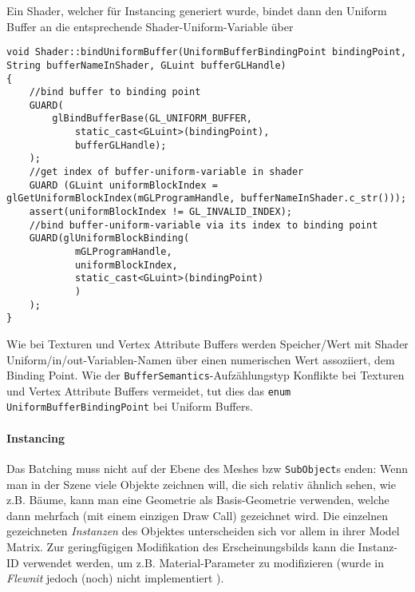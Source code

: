 	Ein Shader, welcher für Instancing generiert wurde, bindet dann den Uniform Buffer an die entsprechende 
	Shader-Uniform-Variable über
	\begin{lstlisting}
void Shader::bindUniformBuffer(UniformBufferBindingPoint bindingPoint, String bufferNameInShader, GLuint bufferGLHandle)
{
	//bind buffer to binding point
	GUARD(
		glBindBufferBase(GL_UNIFORM_BUFFER,
			static_cast<GLuint>(bindingPoint),
			bufferGLHandle);
	);
	//get index of buffer-uniform-variable in shader
	GUARD (GLuint uniformBlockIndex =  glGetUniformBlockIndex(mGLProgramHandle, bufferNameInShader.c_str()));
	assert(uniformBlockIndex != GL_INVALID_INDEX);
	//bind buffer-uniform-variable via its index to binding point	
	GUARD(glUniformBlockBinding(
			mGLProgramHandle,
			uniformBlockIndex,
			static_cast<GLuint>(bindingPoint)
			)
	);
}
	\end{lstlisting}
	Wie bei Texturen und Vertex Attribute Buffers werden Speicher/Wert mit Shader Uniform/in/out-Variablen-Namen 
	über einen numerischen Wert assoziiert, dem Binding Point. Wie der \lstinline|BufferSemantics|-Aufzählungstyp 
	Konflikte bei Texturen und Vertex Attribute Buffers vermeidet, tut dies das 
	\lstinline|enum UniformBufferBindingPoint| bei Uniform Buffers.


	
	\paragraph{Instancing}
	\label{sec:instancing}
	Das Batching muss nicht auf der Ebene des Meshes bzw \lstinline|SubObject|s enden: 
	Wenn man in der Szene viele Objekte zeichnen will,
	die sich relativ ähnlich sehen, wie z.B. Bäume, kann man eine Geometrie als Basis-Geometrie verwenden,
	welche dann mehrfach (mit einem einzigen Draw Call) gezeichnet wird. 
	Die einzelnen gezeichneten \emph{Instanzen} des Objektes unterscheiden sich vor allem in ihrer Model Matrix.
	Zur geringfügigen Modifikation des Erscheinungsbilds kann die Instanz-ID verwendet werden, um z.B. Material-Parameter
	zu modifizieren (wurde in \emph{Flewnit} jedoch (noch) nicht implementiert ).
	
